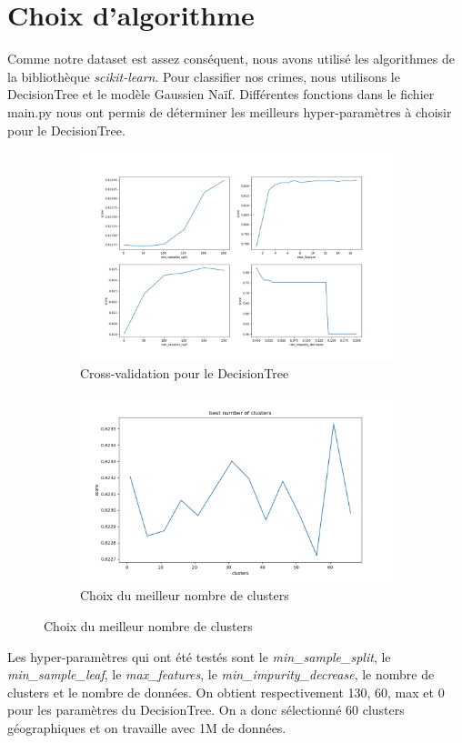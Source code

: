 \documentclass{article}
\begin{document}
    \section{Choix d'algorithme}
    Comme notre dataset est assez conséquent, nous avons utilisé les algorithmes 
    de la bibliothèque \textit{scikit-learn}.
    Pour classifier nos crimes, nous utilisons le DecisionTree et le modèle Gaussien Naïf.
    Différentes fonctions dans le fichier main.py nous ont permis de déterminer
    les meilleurs hyper-paramètres à choisir pour le DecisionTree.
    \begin{figure}[H]
	    \centering
	    \begin{subfigure}{.45\textwidth}
		    \includegraphics[scale=.2]{images/bestParamDecisionTree.png}
		    \caption{Cross-validation pour le DecisionTree}
	    \end{subfigure}
	    \begin{subfigure}{.45\textwidth}
		    \includegraphics[scale=.3]{images/bestNumClusters.png}
		    \caption{Choix du meilleur nombre de clusters}
	    \end{subfigure}
    \end{figure}
    Les hyper-paramètres qui ont été testés sont le \textit{min\_sample\_split}, le \textit{min\_sample\_leaf},
    le \textit{max\_features}, le \textit{min\_impurity\_decrease}, le nombre de clusters et le 
    nombre de données.
    On obtient respectivement 130, 60, max et 0 pour les paramètres du DecisionTree. On a donc sélectionné 60 clusters
    géographiques et on travaille avec 1M de données.
\end{document}
